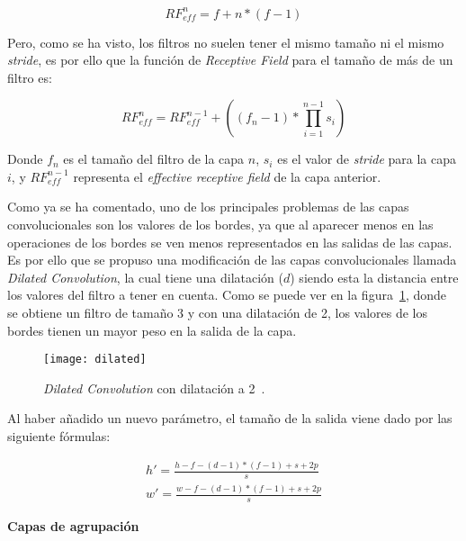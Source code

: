 \begin{equation}
RF_{eff}^n = f + n*(f-1)
\end{equation}

Pero, como se ha visto, los filtros no suelen tener el mismo tamaño ni el mismo \textit{stride}, es por ello que la función de \textit{Receptive Field} para el tamaño de más de un filtro es:

\begin{equation}
RF_{eff}^n = RF_{eff}^{n-1} + ((f_n -1)* \prod_{i=1}^{n-1}s_i)
\end{equation}

Donde $f_n$ es el tamaño del filtro de la capa $n$, $s_i$ es el valor de \textit{stride} para la capa $i$, y $RF_{eff}^{n-1}$ representa el \textit{effective receptive field} de la capa anterior.

Como ya se ha comentado, uno de los principales problemas de las capas convolucionales son los valores de los bordes, ya que al aparecer menos en las operaciones de los bordes se ven menos representados en las salidas de las capas. Es por ello que se propuso una modificación de las capas convolucionales llamada \textit{Dilated Convolution}, la cual tiene una dilatación ($d$) siendo esta la distancia entre los valores del filtro a tener en cuenta. Como se puede ver en la figura~\ref{fig:dilated}, donde se obtiene un filtro de tamaño 3 y con una dilatación de 2, los valores de los bordes tienen un mayor peso en la salida de la capa.

\begin{figure}[h]
	\centering
	\texttt{[image: dilated]}
	\caption[\textit{Dilated Convolution} con dilatación a 2.]{\textit{Dilated Convolution} con dilatación a 2~\cite{cnn}.}
	\label{fig:dilated}
\end{figure}

Al haber añadido un nuevo parámetro, el tamaño de la salida viene dado por las siguiente fórmulas:

\begin{equation}
\begin{split}
h'=\frac{h-f-(d-1)*(f-1)+s+2p}{s}\\w'=\frac{w-f-(d-1)*(f-1)+s+2p}{s}
\end{split}
\end{equation}

\textbf{Capas de agrupación}


